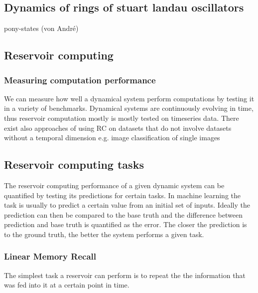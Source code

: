 	

\subsection{Dynamics of rings of stuart landau oscillators}
	pony-states (von André)
	
\subsection{Reservoir computing}
	
	\subsubsection{Measuring computation performance}
	We can measure how well a dynamical system perform computations by testing it in a variety of benchmarks. Dynamical systems are continuously evolving in time, thus reservoir computation mostly is mostly tested on timeseries data. There exist also approaches of using RC on datasets that do not involve datasets without a temporal dimension e.g. image classification of single images \cite{}
	
	
	
	
\subsection{Reservoir computing tasks}
	The reservoir computing performance of a given dynamic system can be quantified by testing its predictions for certain tasks. In machine learning the task is usually to predict a certain value from an initial set of inputs. Ideally the prediction can then be compared to the base truth and the difference between prediction and base truth is quantified as the error. The closer the prediction is to the ground truth, the better the system performs a given task.
	

	

\subsubsection{Linear Memory Recall}
	The simplest task a reservoir can perform is to repeat the the information that was fed into it at a certain point in time.  


